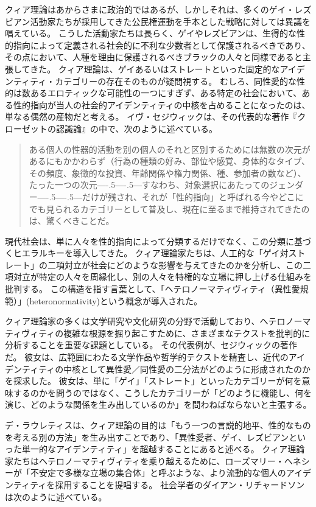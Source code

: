 \documentclass[paper=a4,book,openany]{jlreq}
\newcommand{\ig}[1]{}           %
\def\DDASH{―\kern-.5\zw―\kern-.5\zw―} %
\begin{document}
クィア理論はあからさまに政治的ではあるが、しかしそれは、多くのゲイ・レズビアン活動家たちが採用してきた公民権運動を手本とした戦略に対しては異議を唱えている。
こうした活動家たちは長らく、ゲイやレズビアンは、生得的な性的指向によって定義される社会的に不利な少数者として保護されるべきであり、その点において、人種を理由に保護されるべきブラックの人々と同様であると主張してきた。
クィア理論は、ゲイあるいはストレートといった固定的なアイデンティティ・カテゴリーの存在そのものが疑問視する。
むしろ、同性愛的な性的は数あるエロティックな可能性の一つにすぎず、ある特定の社会において、ある性的指向が当人の社会的アイデンティティの中核を占めることになったのは、単なる偶然の産物だと考える。
イヴ・セジウィックは、その代表的な著作『クローゼットの認識論』の中で、次のように述べている。

\begin{quote}
  ある個人の性器的活動を別の個人のそれと区別するためには無数の次元があるにもかかわらず（行為の種類の好み、部位や感覚、身体的なタイプ、その頻度、象徴的な投資、年齢関係や権力関係、種、参加者の数など）、たった一つの次元{\DDASH}すなわち、対象選択にあたってのジェンダー{\DDASH}だけが残され、それが「性的指向」と呼ばれる今やどこにでも見られるカテゴリーとして普及し、現在に至るまで維持されてきたのは、驚くべきことだ。
\citep{sedgwick90:_epist_closet}

\end{quote}

現代社会は、単に人々を性的指向によって分類するだけでなく、この分類に基づくヒエラルキーを導入してきた。
クィア理論家たちは、人工的な「ゲイ対ストレート」の二項対立が社会にどのような影響を与えてきたのかを分析し、この二項対立が特定の人々を周縁化し、別の人々を特権的な立場に押し上げる仕組みを批判する。
この構造を指す言葉として、「ヘテロノーマティヴィティ（異性愛規範）」(heteronormativity)という概念が導入された\citep{warner91:_introd}。

クィア理論家の多くは文学研究や文化研究の分野で活動しており、ヘテロノーマティヴィティの複雑な根源を掘り起こすために、さまざまなテクストを批判的に分析することを重要な課題としている。
その代表例が、セジウィックの著作だ。
彼女は、広範囲にわたる文学作品や哲学的テクストを精査し、近代のアイデンティティの中核として異性愛／同性愛の二分法がどのように形成されたのかを探求した。
彼女は、単に「ゲイ」「ストレート」といったカテゴリーが何を意味するのかを問うのではなく、こうしたカテゴリーが「どのように機能し、何を演じ、どのような関係を生み出しているのか」を問わねばならないと主張する\citep[p.27]{sedgwick90:_epist_closet}。

デ・ラウレティスは、クィア理論の目的は「もう一つの言説的地平、性的なものを考える別の方法」を生み出すことであり、「異性愛者、ゲイ、レズビアンといった単一的なアイデンティティ」を超越することにあると述べる\citep[p.iv]{lauretis91:_diff}。
クィア理論家たちはヘテロノーマティヴィティを乗り越えるために、ローズマリー・ヘネシーが「不安定で多様な立場の集合体」と呼ぶような、より流動的な個人のアイデンティティを採用することを提唱する\citep[p.965]{hennessy93:_queer_theor}。
社会学者のダイアン・リチャードソン\ig{Diane Richardson}は次のように述べている。
\end{document}
